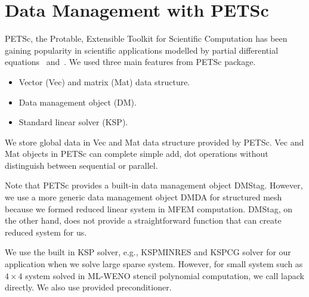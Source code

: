 \section{Data Management with PETSc}
PETSc, the Protable, Extensible Toolkit for Scientific Computation has been 
gaining popularity in scientific applications modelled by partial 
differential equations~\cite{petsc-web-page} and~\cite{petsc-user-ref}.
We used three main features from PETSc package.
\begin{itemize}
		  \item Vector (Vec) and matrix (Mat) data structure.
		  \item Data management object (DM).
		  \item Standard linear solver (KSP).
\end{itemize}

We store global data in Vec and Mat data structure provided by
PETSc. Vec and Mat objects in PETSc can complete simple
add, dot operations without distinguish between sequential or parallel.

Note that PETSc provides a built-in data management object DMStag.
However, we use a more generic data management object DMDA for structured 
mesh because we formed reduced linear system in MFEM computation.
DMStag, on the other hand, does not provide a straightforward function
that can create reduced system for us.

We use the built in KSP solver, e.g., KSPMINRES and KSPCG solver for
our application when we solve large sparse system. However, for small
system such as $4\times 4$ system solved in ML-WENO stencil polynomial
computation, we call lapack directly.
We also use provided preconditioner.

